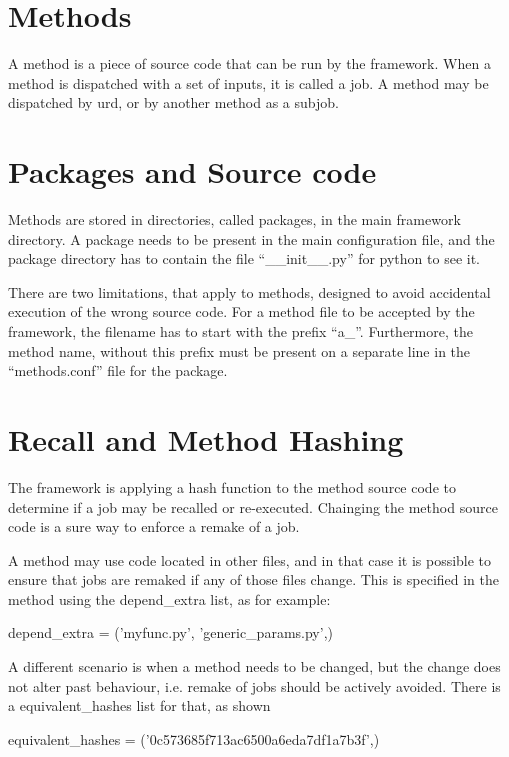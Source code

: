 \section{Methods}

A method is a piece of source code that can be run by the framework.
When a method is dispatched with a set of inputs, it is called a job.
A method may be dispatched by urd, or by another method as a subjob.



\section{Packages and Source code}

Methods are stored in directories, called packages, in the main
framework directory.  A package needs to be present in the main
configuration file, and the package directory has to contain the file
``\_\_init\_\_.py'' for python to see it.

There are two limitations, that apply to methods, designed to avoid
accidental execution of the wrong source code.  For a method file to
be accepted by the framework, the filename has to start with the
prefix ``a\_''.  Furthermore, the method name, without this prefix must
be present on a separate line in the ``methods.conf'' file for the
package.



\section{Recall and Method Hashing}

The framework is applying a hash function to the method source code to
determine if a job may be recalled or re-executed.  Chainging the
method source code is a sure way to enforce a remake of a job.

A method may use code located in other files, and in that case it is
possible to ensure that jobs are remaked if any of those files change.
This is specified in the method using the depend\_extra list, as for
example:

\begin{python}
depend_extra = ('myfunc.py', 'generic_params.py',)
\end{python}

A different scenario is when a method needs to be changed, but the
change does not alter past behaviour, i.e. remake of jobs should be
actively avoided.  There is a equivalent\_hashes list for that, as
shown
\begin{python}
  equivalent_hashes = ('0c573685f713ac6500a6eda7df1a7b3f',)
\end{python}




